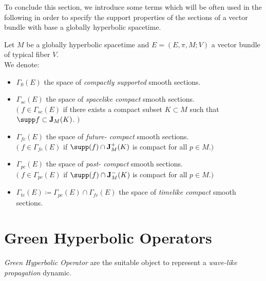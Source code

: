 \documentclass[Main]{subfiles}
\begin{document}
			To conclude this section, we introduce some terms which will be often used in the following in order to
specify the support properties of the sections of a vector bundle with base a globally hyperbolic spacetime.
			\begin{notationfix}
				Let $M$ be a globally hyperbolic spacetime and $E=(E,\pi,M;V)$ a vector bundle of typical fiber $V$.\\
				We denote:
				\begin{itemize}
					\item $\Gamma_0(E)$ the space of \emph{compactly supported} smooth sections.
					\item $\Gamma_{sc}(E)$  the space of \emph{spacelike compact} smooth sections.\\
						$\big(\; f\in \Gamma_{sc}(E)$ if there exists a compact subset $K \subset M$  such that $\supp f \subset \mathbf{J}_M(K)$. $\big)$
					\item  $\Gamma_{fc}(E) $ the space of \emph{future- compact} smooth sections.\\
						$\big(\; f\in \Gamma_{fc}(E) $ if  $\supp(f) \cap  \mathbf{J}^+_M(K)$ is compact for all $p\in M$.$\big)$
					\item  $\Gamma_{pc}(E) $ the space of \emph{past- compact} smooth sections.\\
						$\big(\; f\in \Gamma_{pc}(E) $ if  $\supp(f) \cap  \mathbf{J}^-_M(K)$ is compact for all $p\in M$.$\big)$
					\item $\Gamma_{tc}(E) \coloneqq \Gamma_{pc}(E) \cap \Gamma_{fc}(E) $ the space of \emph{timelike compact} smooth sections.
				\end{itemize}
			\end{notationfix}				
			

		

		\section{Green Hyperbolic Operators}
					\emph{Green Hyperbolic Operator} are the suitable object to represent a \emph{wave-like propagation} dynamic.
					
\end{document}
